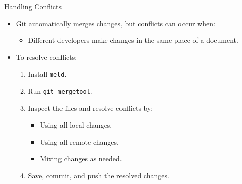 \begin{frame}{Handling Conflicts}
  \begin{itemize}
    \item Git automatically merges changes, but conflicts can occur when:
      \begin{itemize}
        \item Different developers make changes in the same place of a document.
      \end{itemize}
    \item To resolve conflicts:
      \begin{enumerate}
        \item Install \texttt{meld}.
        \item Run \texttt{git mergetool}.
        \item Inspect the files and resolve conflicts by:
          \begin{itemize}
            \item Using all local changes.
            \item Using all remote changes.
            \item Mixing changes as needed.
          \end{itemize}
        \item Save, commit, and push the resolved changes.
      \end{enumerate}
  \end{itemize}
\end{frame}



